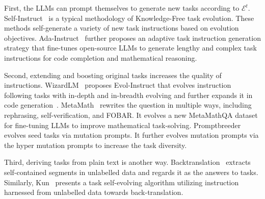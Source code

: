 \documentclass[sn-basic, Numbered]{sn-jnl}%
\def\gE{{\mathcal{E}}}
\theoremstyle{thmstyleone}%
\theoremstyle{thmstyletwo}%
\theoremstyle{thmstylethree}%
\begin{document}

First, the LLMs can prompt themselves to generate new tasks according to $\gE^{t}$.
Self-Instruct~\cite{wang2023self, honovich2022unnatural, roziere2023code} is a typical methodology of Knowledge-Free task evolution. These methods self-generate a variety of new task instructions based on evolution objectives.
Ada-Instruct~\cite{cui2023ada} further proposes an adaptive task instruction generation strategy that fine-tunes open-source LLMs to generate lengthy and complex task instructions for code completion and mathematical reasoning. 

Second, extending and boosting original tasks increases the quality of instructions.
WizardLM~\cite{xu2023wizardlm} proposes Evol-Instruct that evolves instruction following tasks with in-depth and in-breadth evolving and further expands it in code generation~\cite{luo2024wizardcoder}.
MetaMath~\cite{yu2023metamath} rewrites the question in multiple ways, including rephrasing, self-verification, and FOBAR. It evolves a new MetaMathQA dataset for fine-tuning LLMs to improve mathematical task-solving.
Promptbreeder~\cite{fernando2023promptbreeder} evolves seed tasks via mutation prompts. It further evolves mutation prompts via the hyper mutation prompts to increase the task diversity.


Third, deriving tasks from plain text is another way. 
Backtranslation~\cite{li2023self} extracts self-contained segments in unlabelled data and regards it as the answers to tasks. 
Similarly, Kun~\cite{zheng2024kun} presents a task self-evolving algorithm utilizing instruction harnessed from unlabelled data towards back-translation. 

\end{document}
